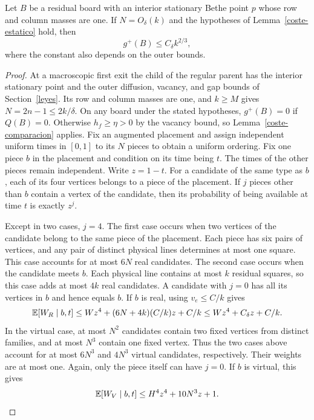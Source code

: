 \begin{proposicion}\label{coste-macro}
Let $B$ be a residual board with an interior stationary Bethe point $p$ whose row and column masses
are one. If $N=O_\delta(k)$ and the hypotheses of Lemma~\ref{coste-estatico} hold, then
\[
 g^+(B)\le C_\delta k^{2/3},
\]
where the constant also depends on the outer bounds.
\end{proposicion}
\begin{proof}
At a macroscopic first exit the child of the regular parent has the interior stationary point
and the outer diffusion, vacancy, and gap bounds of Section~\ref{leyes}. Its row and column masses
are one, and $k\ge M$ gives $N=2n-1\le2k/\delta$. On any board under the stated hypotheses,
$g^+(B)=0$ if $Q(B)=0$.
Otherwise $h_f\ge\eta>0$ by the vacancy bound, so Lemma~\ref{coste-comparacion} applies.
Fix an augmented placement and assign independent
uniform times in $[0,1]$ to its $N$ pieces to obtain a uniform ordering. Fix one piece $b$ in the
placement and condition on its time being $t$. The times of the other pieces remain independent.
Write $z=1-t$. For a candidate of the same type as $b$, each of its four vertices belongs to a
piece of the placement. If $j$ pieces other than $b$ contain a vertex of the candidate, then its
probability of being available at time $t$ is exactly $z^j$.

Except in two cases, $j=4$. The first case occurs when two vertices of the candidate belong to
the same piece of the placement. Each piece has six pairs of vertices, and any pair of distinct
physical lines determines at most one square. This case accounts for at most $6N$ real candidates.
The second case occurs when the candidate meets $b$. Each physical line contains at most $k$
residual squares, so this case adds at most $4k$ real candidates. A candidate with $j=0$ has all
its vertices in $b$ and hence equals $b$. If $b$ is real, using $v_e\le C/k$ gives
\[
 \mathbb{E}[W_R\mid b,t]\le W z^4+(6N+4k)(C/k)z+C/k
                   \le W z^4+C_\delta z+C/k .
\]
In the virtual case, at most $N^2$ candidates contain two fixed vertices from distinct families,
and at most $N^3$ contain one fixed vertex. Thus the two cases above account for at most $6N^3$
and $4N^3$ virtual candidates, respectively. Their weights are at most one. Again, only the piece itself
can have $j=0$. If $b$ is virtual, this gives
\[
 \mathbb{E}[W_V\mid b,t]\le H^4 z^4+10N^3z+1.
\]


\end{proof}

